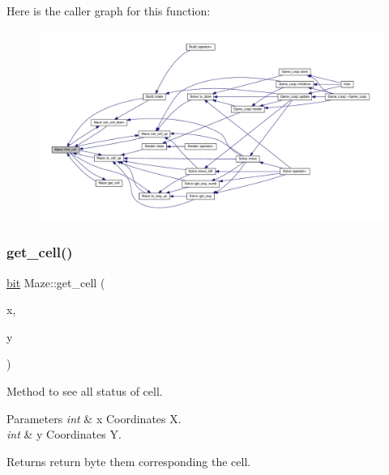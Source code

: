 Here is the caller graph for this function\+:\nopagebreak
\begin{figure}[H]
\begin{center}
\leavevmode
\includegraphics[width=350pt]{classMaze_aa59b935dcd5f7129636cea6e40882c56_icgraph}
\end{center}
\end{figure}
\mbox{\label{classMaze_ae07191c6ec3cc47fce1147bc3f03a8ad}} 
\subsubsection{\texorpdfstring{get\+\_\+cell()}{get\_cell()}}
{\footnotesize\ttfamily \hyperlink{maze_8h_a789d352559efaa396a258805d44f4289}{bit} Maze\+::get\+\_\+cell (\begin{DoxyParamCaption}\item[{int}]{x,  }\item[{int}]{y }\end{DoxyParamCaption})}



Method to see all status of cell. 


\begin{DoxyParams}{Parameters}
{\em int} & x Coordinates X. \\
\hline
{\em int} & y Coordinates Y. \\
\hline
\end{DoxyParams}
\begin{DoxyReturn}{Returns}
return byte them corresponding the cell. 
\end{DoxyReturn}

